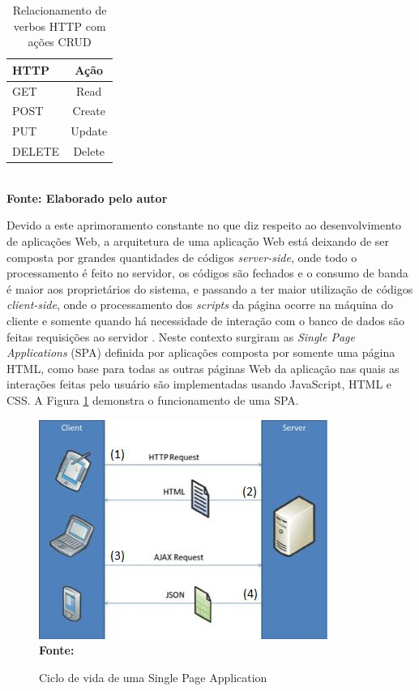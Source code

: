 \begin{table}[htb]
	\centering
	\caption{\hspace{0.1cm} Relacionamento de verbos HTTP com ações CRUD}
	\vspace{-0.3cm} %
	\label{tab:tabela1}
	\begin{tabular}{l|c}
  \hline
    \textbf{HTTP} & \textbf{Ação} \\
    \hline
      GET & Read \\
      POST & Create \\
      PUT & Update \\
      DELETE & Delete \\
     \hline
 \end{tabular}
 	\vspace{.1cm}  %
	\small
	{\footnotesize\\ \textbf{Fonte: Elaborado pelo autor}}
\end{table}

Devido a este aprimoramento constante no que diz respeito ao desenvolvimento de aplicações Web, a arquitetura de uma aplicação Web está deixando 
de ser composta por grandes quantidades de códigos \textit{server-side}, onde todo o processamento é feito no servidor, os códigos são fechados e 
o consumo de banda é maior aos proprietários do sistema, e passando a ter maior utilização de códigos \textit{client-side}, onde o processamento dos 
\textit{scripts} da página ocorre na máquina do cliente e somente quando há necessidade de interação com o banco de dados são feitas requisições ao 
servidor \cite{spa01}. Neste contexto surgiram as \textit{Single Page Applications} (SPA) definida por \cite{spa02} aplicações composta por somente 
uma página HTML, como base para todas as outras páginas Web da aplicação nas quais as interações feitas pelo usuário são implementadas usando 
JavaScript, HTML e CSS. A Figura \ref{fig:spa} demonstra o funcionamento de uma SPA.

\begin{figure}[!ht]
	\centering	
	\caption[\hspace{0.1cm} Ciclo de vida de uma Single Page Application.]{Ciclo de vida de uma Single Page Application}
	  \vspace{-0.4cm}
	\includegraphics[width=.6\textwidth]{figuras/spa.png}
	 \vspace{-0.3cm}
	\\\textbf{\footnotesize Fonte: \cite{spa02}}
	\label{fig:spa}
\end{figure}

